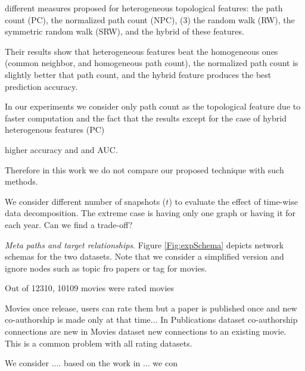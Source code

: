 different measures proposed for heterogeneous topological features: the path count (PC), the normalized path count (NPC), (3) the random walk (RW), the symmetric random walk (SRW), and the hybrid of these features.

Their results show that heterogeneous features beat the homogeneous ones (common neighbor, and homogeneous path count), the normalized path count is slightly better that path count, and the hybrid feature produces the best prediction accuracy.

In our experiments we consider only path count as the topological feature due to faster computation and the fact that the results except for the case of hybrid heterogenous features (PC) 

higher accuracy and and AUC.

\cite{liben2007link}

Therefore in this work we do not compare our proposed technique with such methods.

We consider different number of snapshots ($t$) to evaluate the effect of time-wise data decomposition. The extreme case is having only one graph or having it for each year. Can we find a trade-off?


\textit{Meta paths and target relationships}. Figure \ref{Fig:expSchema} depicts network schemas for the two datasets. Note that we consider a simplified version and ignore nodes such as topic fro papers or tag for movies.

Out of 12310, 10109 movies were rated movies


Movies once release, users can rate them but a paper is published once and new co-authorship is made only at that time... In Publications dataset co-authorship connections are new in Movies dataset new connections to an existing movie. This is a common problem with all rating datasets.

We consider .... based on the work in ... we con



